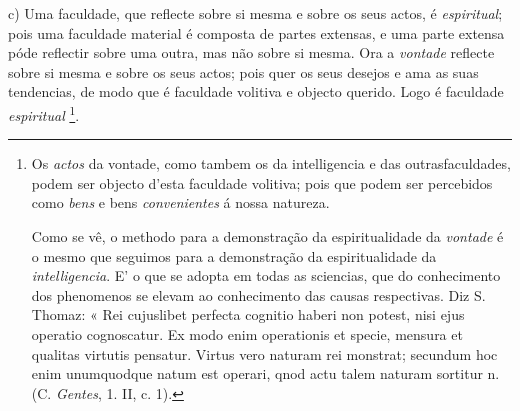 c) Uma faculdade, que reflecte sobre si mesma e sobre os seus actos, é \emph{espiritual}; pois uma faculdade material é composta de partes extensas, e uma parte extensa póde reflectir sobre uma outra, mas não sobre si mesma. Ora a \emph{vontade} reflecte sobre si mesma e sobre os seus actos; pois quer os seus desejos e ama as suas tendencias, de modo que é faculdade volitiva e objecto querido. Logo é faculdade \emph{espiritual} \footnote{Os \emph{actos} da vontade, como tambem os da intelligencia e das outrasfaculdades, podem ser objecto d'esta faculdade volitiva; pois que podem ser percebidos como \emph{bens} e bens \emph{convenientes} á nossa natureza.\par Como se vê, o methodo para a demonstração da espiritualidade da \emph{vontade} é o mesmo que seguimos para a demonstração da espiritualidade da \emph{intelligencia}. E' o que se adopta em todas as sciencias, que do conhecimento dos phenomenos se elevam ao conhecimento das causas respectivas. Diz S. Thomaz: « Rei cujuslibet perfecta cognitio haberi non potest, nisi ejus operatio cognoscatur. Ex modo enim operationis et specie, mensura et qualitas virtutis pensatur. Virtus vero naturam rei monstrat; secundum hoc enim unumquodque natum est operari, qnod actu talem naturam sortitur n. (C. \emph{Gentes}, 1. II, c. 1).}.


